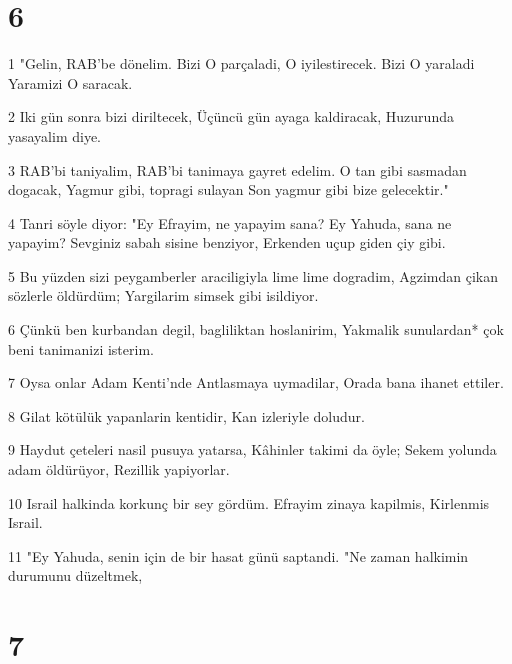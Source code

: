\chapter{6}

\par 1 "Gelin, RAB'be dönelim. Bizi O parçaladi, O iyilestirecek. Bizi O yaraladi Yaramizi O saracak.
\par 2 Iki gün sonra bizi diriltecek, Üçüncü gün ayaga kaldiracak, Huzurunda yasayalim diye.
\par 3 RAB'bi taniyalim, RAB'bi tanimaya gayret edelim. O tan gibi sasmadan dogacak, Yagmur gibi, topragi sulayan Son yagmur gibi bize gelecektir."
\par 4 Tanri söyle diyor: "Ey Efrayim, ne yapayim sana? Ey Yahuda, sana ne yapayim? Sevginiz sabah sisine benziyor, Erkenden uçup giden çiy gibi.
\par 5 Bu yüzden sizi peygamberler araciligiyla lime lime dogradim, Agzimdan çikan sözlerle öldürdüm; Yargilarim simsek gibi isildiyor.
\par 6 Çünkü ben kurbandan degil, bagliliktan hoslanirim, Yakmalik sunulardan* çok beni tanimanizi isterim.
\par 7 Oysa onlar Adam Kenti'nde Antlasmaya uymadilar, Orada bana ihanet ettiler.
\par 8 Gilat kötülük yapanlarin kentidir, Kan izleriyle doludur.
\par 9 Haydut çeteleri nasil pusuya yatarsa, Kâhinler takimi da öyle; Sekem yolunda adam öldürüyor, Rezillik yapiyorlar.
\par 10 Israil halkinda korkunç bir sey gördüm. Efrayim zinaya kapilmis, Kirlenmis Israil.
\par 11 "Ey Yahuda, senin için de bir hasat günü saptandi. "Ne zaman halkimin durumunu düzeltmek,

\chapter{7}

